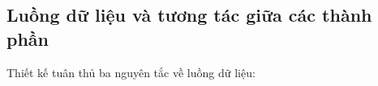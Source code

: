 



\subsection{Luồng dữ liệu và tương tác giữa các thành phần}

Thiết kế tuân thủ ba nguyên tắc về luồng dữ liệu:

